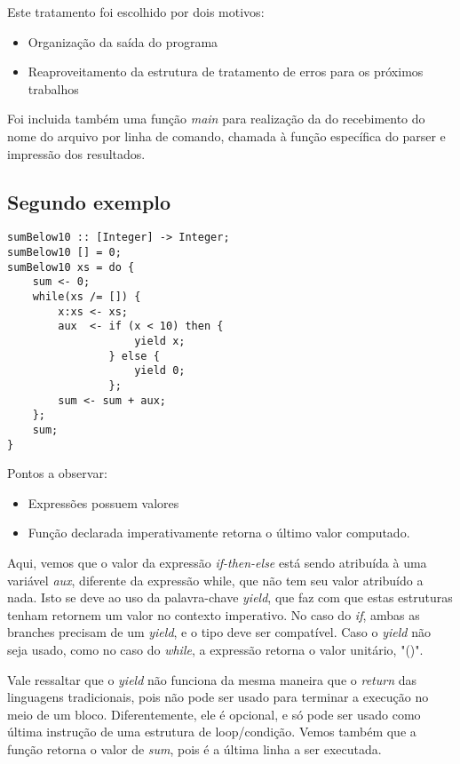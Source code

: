 \documentclass[11pt]{article}
\begin{document}
Este tratamento foi escolhido por dois motivos:

\begin{itemize}[leftmargin=.5in]
  \item Organização da saída do programa
  \item Reaproveitamento da estrutura de tratamento de erros para os próximos trabalhos
\end{itemize}

Foi incluida também uma função \emph{main} para realização da do recebimento do nome do
arquivo por linha de comando, chamada à função específica do parser e impressão dos resultados.



\subsection{Segundo exemplo}

\begin{lstlisting}[basicstyle=\small]
sumBelow10 :: [Integer] -> Integer;
sumBelow10 [] = 0;
sumBelow10 xs = do {
    sum <- 0;
    while(xs /= []) {
        x:xs <- xs;
        aux  <- if (x < 10) then {
                    yield x;
                } else {
                    yield 0;
                };
        sum <- sum + aux;
    };
    sum;
}
\end{lstlisting}

Pontos a observar:
\begin{itemize}[leftmargin=.5in]
\item Expressões possuem valores
\item Função declarada imperativamente retorna o último valor computado.
\end{itemize}


Aqui, vemos que o valor da expressão \emph{if-then-else} está sendo atribuída à uma variável 
\emph{aux}, diferente da expressão while, que não tem seu valor atribuído a nada.
Isto se deve ao uso da palavra-chave \emph{yield}, que faz com que estas estruturas tenham retornem 
um valor no contexto imperativo. No caso do \emph{if}, ambas as branches precisam
de um \emph{yield}, e o tipo deve ser compatível.
Caso o \emph{yield} não seja usado, como no caso do \emph{while}, a expressão retorna o valor 
unitário, "()".

Vale ressaltar que o \emph{yield} não funciona da mesma maneira que o \emph{return} das linguagens 
tradicionais, pois não pode ser usado para terminar a execução no meio de um bloco.
Diferentemente, ele é opcional, e só pode ser usado como última instrução de uma estrutura de 
loop/condição.
Vemos também que a função retorna o valor de \emph{sum}, pois é a última linha a ser executada.
\end{document}
